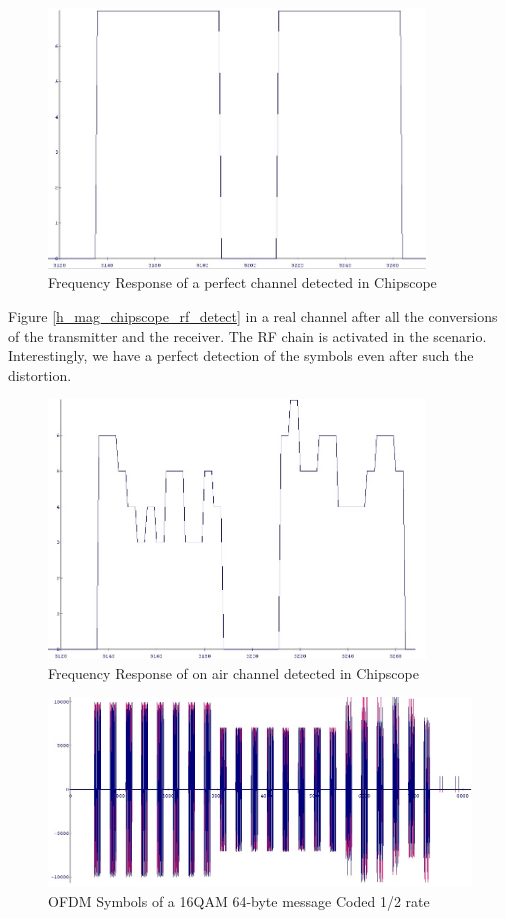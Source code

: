 \begin{figure}
\centering
\includegraphics[width=10cm]{content/fig/h_mag_chipscope_noChannel.JPG}
\caption{Frequency Response of a perfect channel detected in Chipscope}
\label{fig:h_mag_chipscope_noChannel}
\end{figure}

Figure \ref{h_mag_chipscope_rf_detect} in a real channel after all the conversions of the transmitter and the receiver. The RF chain is activated in the scenario. Interestingly, we have a perfect detection of the symbols even after such the distortion.\\

\begin{figure}
\centering
\includegraphics[width=10cm]{content/fig/h_mag_chipscope_rf_detect.JPG}
\caption{Frequency Response of on air channel detected in Chipscope}
\label{fig:h_mag_chipscope_rf_detect}
\end{figure}

\begin{figure}
\centering
\includegraphics[width=\textwidth]{content/fig/OfdmSym_16qam_1_2_code_64byte.JPG}
\caption{OFDM Symbols of a 16QAM 64-byte message Coded 1/2 rate}
\label{fig:OfdmSym_16qam_1_2_code_64byte}
\end{figure}

